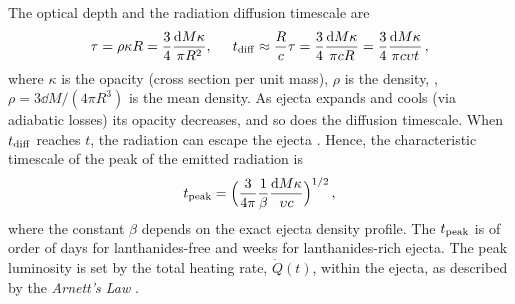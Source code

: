 The optical depth and the radiation diffusion timescale are  
%
\begin{equation}
\tau = \rho \kappa R = \frac{3}{4}\frac{\text{d} M\kappa}{\pi R^2}, \hspace{5mm} 
t_{\rm diff} \approx \frac{R}{c}\tau = \frac{3}{4}\frac{\text{d} M\kappa}{\pi c R} = \frac{3}{4}\frac{\text{d} M\kappa}{\pi c \upsilon t}\, ,
\end{equation}
%
where 
$\kappa$ is the opacity (cross section per unit mass), 
$\rho$ is the density, \eg, $\rho=3 \dd M/(4\pi R^3)$ is the mean density.
%
As ejecta expands and cools (via adiabatic losses) its opacity decreases, 
and so does the diffusion timescale. 
When $t_{\rm diff}$ reaches $t$, the radiation can escape the ejecta \citep{Arnett:1982}. 
Hence, the characteristic timescale of the peak of the emitted radiation is 
%
\begin{equation}
t_{\rm peak} = \Big(\frac{3}{4\pi}\frac{1}{\beta}\frac{\text{d} M\kappa}{\upsilon c}\Big)^{1/2}\, ,
\end{equation}
%
where the constant $\beta$ depends on the exact ejecta density profile. 
The $t_{\rm peak}$ is of order of days for lanthanides-free and weeks for lanthanides-rich ejecta.
The peak luminosity is set by the total heating rate, $\dot{Q}(t)$, 
within the ejecta, as described by the \textit{Arnett's Law} 
\citep{Arnett:1982}. 


